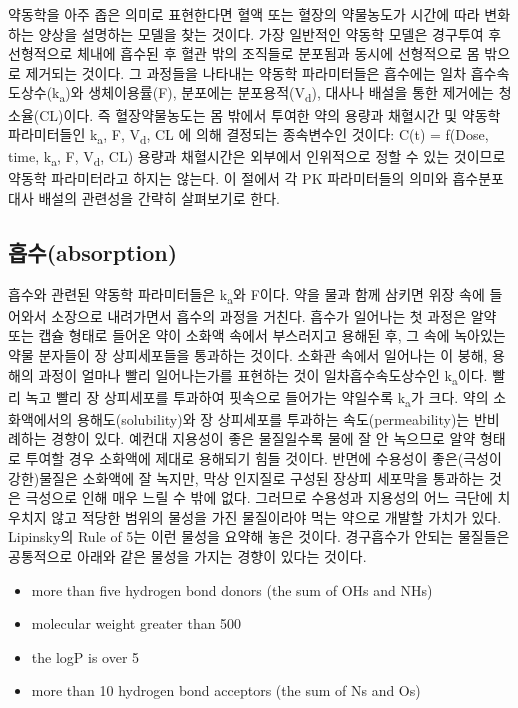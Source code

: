 \documentclass[
  11pt,
  krantz2, a4paper, twoside]{krantz}
\providecommand{\tightlist}{%
  \setlength{\itemsep}{0pt}\setlength{\parskip}{0pt}}
\theoremstyle{definition}
\theoremstyle{definition}
\theoremstyle{definition}
\theoremstyle{definition}
\theoremstyle{remark}
\begin{document}
약동학을 아주 좁은 의미로 표현한다면 혈액 또는 혈장의 약물농도가 시간에
따라 변화하는 양상을 설명하는 모델을 찾는 것이다. 가장 일반적인 약동학
모델은 경구투여 후 선형적으로 체내에 흡수된 후 혈관 밖의 조직들로 분포됨과 동시에 선형적으로 몸 밖으로 제거되는 것이다. 그 과정들을 나타내는 약동학
파라미터들은 흡수에는 일차 흡수속도상수(k\textsubscript{a})와 생체이용률(F), 분포에는
분포용적(V\textsubscript{d}), 대사나 배설을 통한 제거에는 청소율(CL)이다. 즉
혈장약물농도는 몸 밖에서 투여한 약의 용량과 채혈시간 및 약동학
파라미터들인 k\textsubscript{a}, F, V\textsubscript{d}, CL 에 의해 결정되는 종속변수인 것이다: C(t) =
f(Dose, time, k\textsubscript{a}, F, V\textsubscript{d}, CL) 용량과 채혈시간은 외부에서 인위적으로 정할
수 있는 것이므로 약동학 파라미터라고 하지는 않는다. 이 절에서 각 PK
파라미터들의 의미와 흡수분포대사 배설의 관련성을 간략히 살펴보기로 한다.

\hypertarget{uxd761uxc218absorption}{%
\subsection{흡수(absorption)}\label{uxd761uxc218absorption}}

흡수와 관련된 약동학 파라미터들은 k\textsubscript{a}와 F이다. 약을 물과 함께 삼키면 위장
속에 들어와서 소장으로 내려가면서 흡수의 과정을 거친다. 흡수가 일어나는
첫 과정은 알약 또는 캡슐 형태로 들어온 약이 소화액 속에서 부스러지고
용해된 후, 그 속에 녹아있는 약물 분자들이 장 상피세포들을 통과하는
것이다. 소화관 속에서 일어나는 이 붕해, 용해의 과정이 얼마나 빨리
일어나는가를 표현하는 것이 일차흡수속도상수인 k\textsubscript{a}이다. 빨리 녹고 빨리 장
상피세포를 투과하여 핏속으로 들어가는 약일수록 k\textsubscript{a}가 크다. 약의
소화액에서의 용해도(solubility)와 장 상피세포를 투과하는
속도(permeability)는 반비례하는 경향이 있다. 예컨대 지용성이 좋은
물질일수록 물에 잘 안 녹으므로 알약 형태로 투여할 경우 소화액에 제대로
용해되기 힘들 것이다. 반면에 수용성이 좋은(극성이 강한)물질은 소화액에
잘 녹지만, 막상 인지질로 구성된 장상피 세포막을 통과하는 것은 극성으로
인해 매우 느릴 수 밖에 없다. 그러므로 수용성과 지용성의 어느 극단에
치우치지 않고 적당한 범위의 물성을 가진 물질이라야 먹는 약으로 개발할
가치가 있다. Lipinsky의 Rule of 5는 이런 물성을 요약해 놓은 것이다.
경구흡수가 안되는 물질들은 공통적으로 아래와 같은 물성을 가지는 경향이
있다는 것이다.

\begin{itemize}
\tightlist
\item
  more than five hydrogen bond donors (the sum of OHs and NHs)
\item
  molecular weight greater than 500
\item
  the logP is over 5
\item
  more than 10 hydrogen bond acceptors (the sum of Ns and Os)
\end{itemize}
\end{document}
